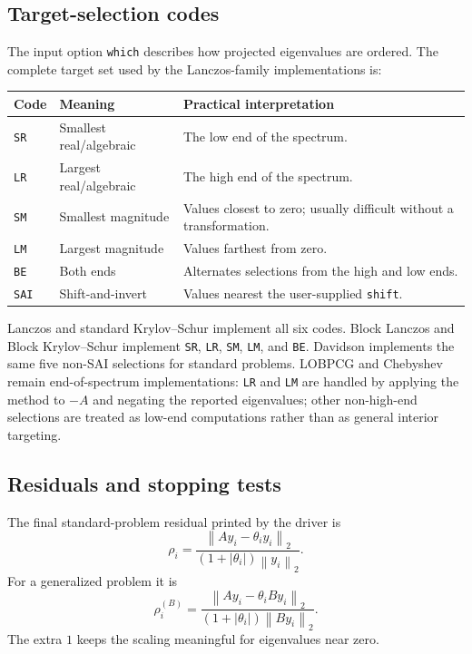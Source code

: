 \documentclass[11pt]{article}
\newcommand{\code}[1]{\texttt{#1}}
\newcommand{\norm}[1]{\left\lVert #1\right\rVert_2}
\begin{document}
\subsection{Target-selection codes}

The input option \code{which} describes how projected eigenvalues are ordered.
The complete target set used by the Lanczos-family implementations is:

\begin{center}
\begin{tabular}{P{0.12\textwidth} P{0.33\textwidth} P{0.43\textwidth}}
\toprule
Code & Meaning & Practical interpretation \\
\midrule
\code{SR} & Smallest real/algebraic & The low end of the spectrum. \\
\code{LR} & Largest real/algebraic & The high end of the spectrum. \\
\code{SM} & Smallest magnitude & Values closest to zero; usually difficult without a transformation. \\
\code{LM} & Largest magnitude & Values farthest from zero. \\
\code{BE} & Both ends & Alternates selections from the high and low ends. \\
\code{SAI} & Shift-and-invert & Values nearest the user-supplied \code{shift}. \\
\bottomrule
\end{tabular}
\end{center}

Lanczos and standard Krylov--Schur implement all six codes.  Block Lanczos and
Block Krylov--Schur implement \code{SR}, \code{LR}, \code{SM}, \code{LM}, and
\code{BE}.  Davidson implements the same five non-SAI selections for standard
problems.  LOBPCG and Chebyshev remain end-of-spectrum implementations:
\code{LR} and \code{LM} are handled by applying the method to $-A$ and negating
the reported eigenvalues; other non-high-end selections are treated as low-end
computations rather than as general interior targeting.

\subsection{Residuals and stopping tests}

The final standard-problem residual printed by the driver is
\begin{equation}
  \rho_i =
  \frac{\norm{Ay_i-\theta_i y_i}}
       {(1+|\theta_i|)\norm{y_i}}.
  \label{eq:standard-residual}
\end{equation}
For a generalized problem it is
\begin{equation}
  \rho_i^{(B)} =
  \frac{\norm{Ay_i-\theta_i By_i}}
       {(1+|\theta_i|)\norm{By_i}}.
  \label{eq:generalized-residual}
\end{equation}
The extra $1$ keeps the scaling meaningful for eigenvalues near zero.
\end{document}
